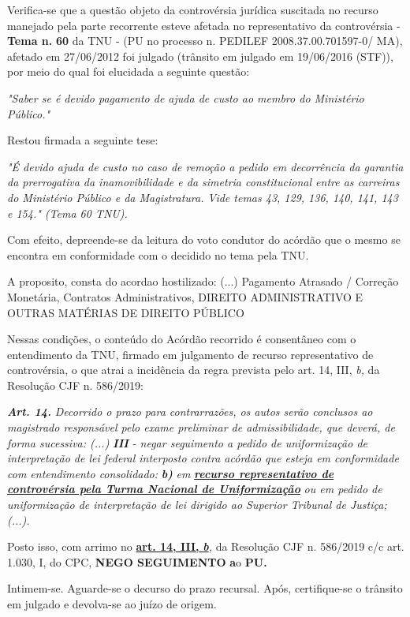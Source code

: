 \documentclass[12pt]{article}
\begin{document}
\justifying
\noindent Verifica-se que a questão objeto da controvérsia jurídica suscitada no recurso manejado pela parte recorrente esteve afetada no representativo da controvérsia - \textbf{Tema n. }\textbf{60} da TNU - (PU no processo n. PEDILEF 2008.37.00.701597-0/ MA),  afetado em 27/06/2012 foi julgado (trânsito em julgado em 19/06/2016 (STF)), por meio do qual foi elucidada a seguinte questão:

\noindent \textit{"Saber se é devido pagamento de ajuda de custo ao membro do Ministério Público."}

\noindent Restou firmada a seguinte tese:

\noindent \textit{"É devido ajuda de custo no caso de remoção a pedido em decorrência da garantia da prerrogativa da inamovibilidade e da simetria constitucional entre as carreiras do Ministério Público e da Magistratura. Vide temas 43, 129, 136, 140, 141, 143 e 154." (Tema 60 TNU).}

\noindent Com efeito, depreende-se da leitura do voto condutor do acórdão que o mesmo se encontra em conformidade com o decidido no  tema pela TNU.

\noindent A proposito, consta do acordao hostilizado: (...) Pagamento Atrasado / Correção Monetária, Contratos Administrativos, DIREITO ADMINISTRATIVO E OUTRAS MATÉRIAS DE DIREITO PÚBLICO

\noindent Nessas condições, o conteúdo do Acórdão recorrido é consentâneo com o entendimento da TNU, firmado em julgamento de recurso representativo de controvérsia, o que atrai a incidência da regra prevista pelo art. 14, III, \textit{b,} da Resolução CJF n. 586/2019:

\noindent \textit{\textbf{Art. 14.}}\textit{ Decorrido o prazo para contrarrazões, os autos serão conclusos ao magistrado responsável pelo exame preliminar de admissibilidade, que deverá, de forma sucessiva: (...) }\textit{\textbf{III }}\textit{- negar seguimento a pedido de uniformização de interpretação de lei federal interposto contra acórdão que esteja em conformidade com entendimento consolidado: }\textit{\textbf{b)}}\textit{ em }\uline{\textit{\textbf{recurso representativo de controvérsia pela Turma Nacional de Uniformização}}}\textit{ ou em pedido de uniformização de interpretação de lei dirigido ao Superior Tribunal de Justiça;(...).}

\noindent Posto isso, com arrimo no \uline{\textbf{art. 14, III, }}\uline{\textit{\textbf{b}}}\textit{,} da Resolução CJF n. 586/2019 c/c art. 1.030, I, do CPC, \textbf{NEGO SEGUIMENTO }\textbf{a}o\textbf{ PU}\textbf{.}

\noindent Intimem-se. Aguarde-se o decurso do prazo recursal. Após, certifique-se o trânsito em julgado e devolva-se ao juízo de origem.
\end{document}
